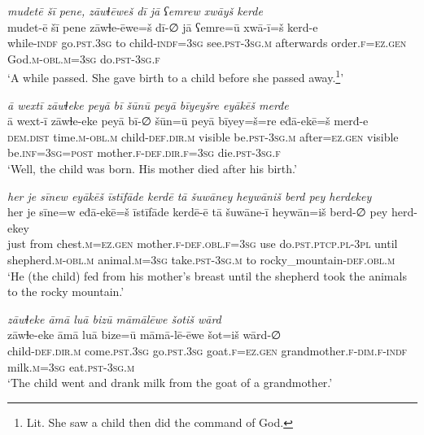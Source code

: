 \ea \label{KŠ.22}
\textit{mudetē šī pene, zāwɫēweš dī jā ʕemrew xwāyš kerde} \\ 
\gll mudet-ē šī pene zāwɫe-ēwe=š dī-∅ jā ʕemre=ū xwā-ī=š kerd-e \\ 
 while\textsc{-indf} go\textsc{.pst}\textsc{.3sg} to child\textsc{-indf}\textsc{=3sg} see\textsc{.pst}\textsc{-3sg}\textsc{.m} afterwards order\textsc{.f}\textsc{=ez.gen} God\textsc{.m}\textsc{-obl}\textsc{.m}\textsc{=3sg} do\textsc{.pst}\textsc{-3sg}\textsc{.f} \\ 
\glt `A while passed. She gave birth to a child before she passed away.\footnote{Lit. She saw a child then did the command of God.}'
\z 
 
\ea \label{KŠ.23}
\textit{ā wextī zāwɫeke peyā bī šūnū peyā bīyeyšre eyākēš merđe} \\ 
\gll ā wext-ī zāwɫe-eke peyā bī-∅ šūn=ū peyā bīyey=š=re eđā-ekē=š merđ-e \\ 
 \textsc{dem.dist} time\textsc{.m}\textsc{-obl}\textsc{.m} child\textsc{-def}\textsc{.dir}\textsc{.m} visible be\textsc{.pst}\textsc{-3sg}\textsc{.m} after\textsc{=ez.gen} visible be\textsc{.inf}\textsc{=3sg}\textsc{=\textsc{post}} mother\textsc{.f}\textsc{-def}\textsc{.dir}\textsc{.f}\textsc{=3sg} die\textsc{.pst}\textsc{-3sg}\textsc{.f} \\ 
\glt `Well, the child was born. His mother died after his birth.'
\z 
 
\ea \label{KŠ.24}
\textit{her je sīnew eyākēš īstīfāde kerdē tā šuwāney heywāniš berd pey herdekey} \\ 
\gll her je sīne=w eđā-ekē=š īstīfāde kerdē-ē tā šuwāne-ī heywān=iš berd-∅ pey herd-ekey \\ 
 just from chest\textsc{.m}\textsc{=ez.gen} mother\textsc{.f}\textsc{-def}\textsc{.obl}\textsc{.f}\textsc{=3sg} use do\textsc{.pst}\textsc{.ptcp}\textsc{.pl}\textsc{-3pl} until shepherd\textsc{.m}\textsc{-obl}\textsc{.m} animal\textsc{.m}\textsc{=3sg} take\textsc{.pst}\textsc{-3sg}\textsc{.m} to rocky\_mountain\textsc{-def}\textsc{.obl}\textsc{.m} \\ 
\glt `He (the child) fed from his mother’s breast until the shepherd took the animals to the rocky mountain.'
\z 
 
\ea \label{KŠ.25}
\textit{zāwɫeke āmā luā bizū māmālēwe šotiš wārd} \\ 
\gll zāwɫe-eke āmā luā bize=ū māmā-lē-ēwe šot=iš wārd-∅ \\ 
 child\textsc{-def}\textsc{.dir}\textsc{.m} come\textsc{.pst}\textsc{.3sg} go\textsc{.pst}\textsc{.3sg} goat\textsc{.f}\textsc{=ez.gen} grandmother\textsc{.f}\textsc{-dim}\textsc{.f}\textsc{-indf} milk\textsc{.m}\textsc{=3sg} eat\textsc{.pst}\textsc{-3sg}\textsc{.m} \\ 
\glt `The child went and drank milk from the goat of a grandmother.'
\z 
 
